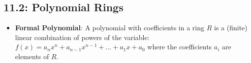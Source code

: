 \documentclass[12pt]{article}
\begin{document}
\subsection*{11.2: Polynomial Rings}
\begin{itemize}
  \item \textbf{Formal Polynomial}: A polynomial with coefficients in a ring $R$ is a (finite) linear combination of powers of the variable: $f(x) = a_nx^n + a_{n-1}x^{n-1} + ... + a_1x + a_0$ where the coefficients $a_i$ are elements of $R$.
\end{itemize}

\iffalse
\subsection*{Problem 1.1}
\textbf{Prove that 7 + $\sqrt[3]{2}$ and $\sqrt{3}$ + $\sqrt{-5}$ are algeabraic numbers.}
\begin{proof}
Since p is not in M, it is not between or equal to a and b, and therefore any interval that contains p is not within M.
\end{proof}
\fi
\end{document}
